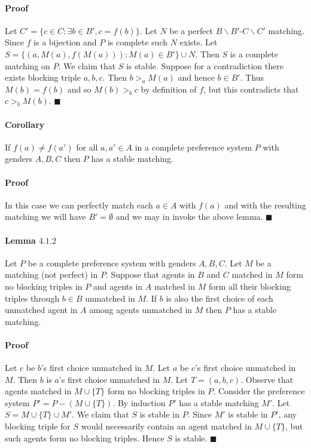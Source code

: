 \documentclass[letterpaper,12pt,oneside,onecolumn]{article}
\begin{document}
\paragraph{Proof}
Let $C' = \{ c \in C : \exists b\in B', c = f(b)\}$. Let $N$ be a perfect $B\backslash B'$-$C\backslash C'$ matching. Since $f$ is a bijection and $P$ is complete such $N$ exists. Let $S = \{ (a, M(a), f(M(a))) : M(a) \in B' \} \cup N$. Then $S$ is a complete matching on $P$. We claim that $S$ is stable. Suppose for a contradiction there exists blocking triple $a,b,c$. Then $b >_a M(a)$ and hence $b \in B'$. Thus $M(b) = f(b)$ and so $M(b) >_b c$ by definition of $f$, but this contradicts that $c >_b M(b)$. $\blacksquare$
\paragraph{Corollary}
If $f(a) \neq f(a')$ for all $a,a' \in A$ in a complete preference system $P$ with genders $A,B,C$ then $P$ has a stable matching.
\paragraph{Proof}
In this case we can perfectly match each $a \in A$ with $f(a)$ and with the resulting matching we will have $B' = \emptyset$ and we may in invoke the above lemma. $\blacksquare$
\paragraph{Lemma $4.1.2$} Let $P$ be a complete preference system with genders $A,B,C$. Let $M$ be a matching (not perfect) in $P$. Suppose that agents in $B$ and $C$ matched in $M$ form no blocking triples in $P$ and agents in $A$ matched in $M$ form all their blocking triples through $b \in B$ unmatched in $M$. If $b$ is also the first choice of each unmatched agent in $A$ among agents unmatched in $M$ then $P$ has a stable matching.
\paragraph{Proof}
Let $c$ be $b$'s first choice unmatched in $M$. Let $a$ be $c$'s first choice unmatched in $M$. Then $b$ is $a$'s first choice unmatched in $M$. Let $T = (a,b,c)$. Observe that agents matched in $M \cup \{T\}$ form no blocking triples in $P$. Consider the preference system $P' = P - (M \cup \{T\})$. By induction $P'$ has a stable matching $M'$. Let $S = M \cup \{T\} \cup M'$. We claim that $S$ is stable in $P$. Since $M'$ is stable in $P'$, any blocking triple for $S$ would necessarily contain an agent matched in $M \cup \{T\}$, but such agents form no blocking triples. Hence $S$ is stable. $\blacksquare$
\end{document}
